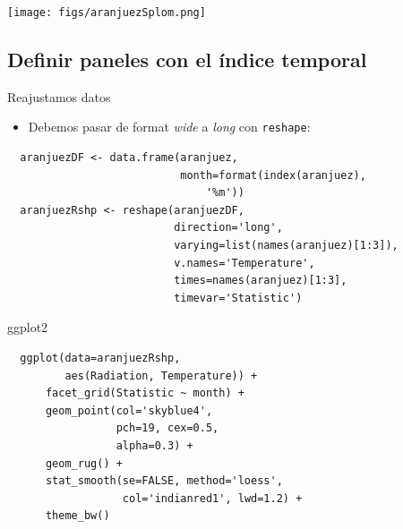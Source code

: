 \documentclass[xcolor={usenames,svgnames,dvipsnames}]{beamer}
\begin{document}
\begin{frame}[label=sec-4-1-2]{}
\texttt{[image: figs/aranjuezSplom.png]}
\end{frame}




\subsection{Definir paneles con el índice temporal}
\label{sec-4-2}

\begin{frame}[fragile,label=sec-4-2-1]{Reajustamos datos}
 \begin{itemize}
\item Debemos pasar de format \emph{wide} a \emph{long} con \texttt{reshape}:
\end{itemize}
\lstset{language=R,label= ,caption= ,numbers=none}
\begin{lstlisting}
  aranjuezDF <- data.frame(aranjuez,
                           month=format(index(aranjuez),
                               '%m'))
  aranjuezRshp <- reshape(aranjuezDF,
                          direction='long',
                          varying=list(names(aranjuez)[1:3]),
                          v.names='Temperature',
                          times=names(aranjuez)[1:3],
                          timevar='Statistic')
\end{lstlisting}
\end{frame}

\begin{frame}[fragile,label=sec-4-2-2]{ggplot2}
 \lstset{language=R,label= ,caption= ,numbers=none}
\begin{lstlisting}
  ggplot(data=aranjuezRshp,
         aes(Radiation, Temperature)) +
      facet_grid(Statistic ~ month) +
      geom_point(col='skyblue4',
                 pch=19, cex=0.5,
                 alpha=0.3) +
      geom_rug() +
      stat_smooth(se=FALSE, method='loess',
                  col='indianred1', lwd=1.2) +
      theme_bw()
\end{lstlisting}
\end{frame}
\end{document}
